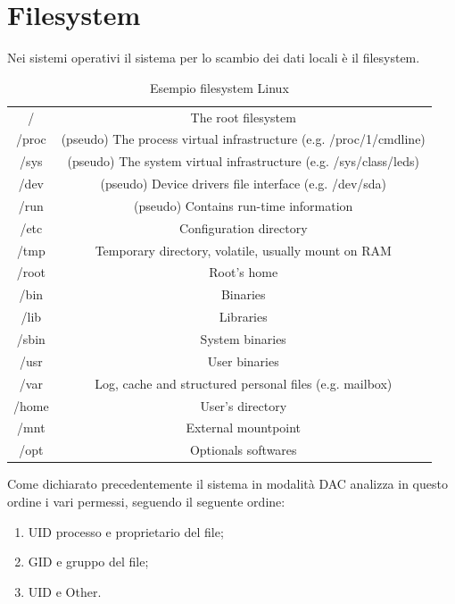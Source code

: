 \section{Filesystem}
Nei sistemi operativi il sistema per lo scambio dei dati locali è il filesystem.
\clearpage
\begin{center}
    \begin{table}[]
        \centering
        \begin{tabular}{|c|c|}
            / & The root filesystem \\
            /proc & (pseudo) The process virtual infrastructure (e.g. /proc/1/cmdline) \\
            /sys & (pseudo) The system virtual infrastructure (e.g. /sys/class/leds) \\
            /dev & (pseudo) Device drivers file interface (e.g. /dev/sda) \\
            /run &  (pseudo) Contains run-time information \\
            /etc & Configuration directory \\
            /tmp & Temporary directory, volatile, usually mount on RAM \\
            /root & Root's home \\
            /bin & Binaries \\
            /lib & Libraries \\
            /sbin & System binaries \\
            /usr & User binaries \\
            /var & Log, cache and structured personal files (e.g. mailbox) \\
            /home & User's directory \\
            /mnt & External mountpoint \\
            /opt & Optionals softwares \\
        \end{tabular}
        \caption{Esempio filesystem Linux}
    \end{table}
\end{center}
Come dichiarato precedentemente il sistema in modalità DAC analizza in questo ordine i vari permessi, seguendo il seguente ordine:
\begin{enumerate}
    \item UID processo e proprietario del file;
    \item GID e gruppo del file;
    \item UID e Other.
\end{enumerate}
